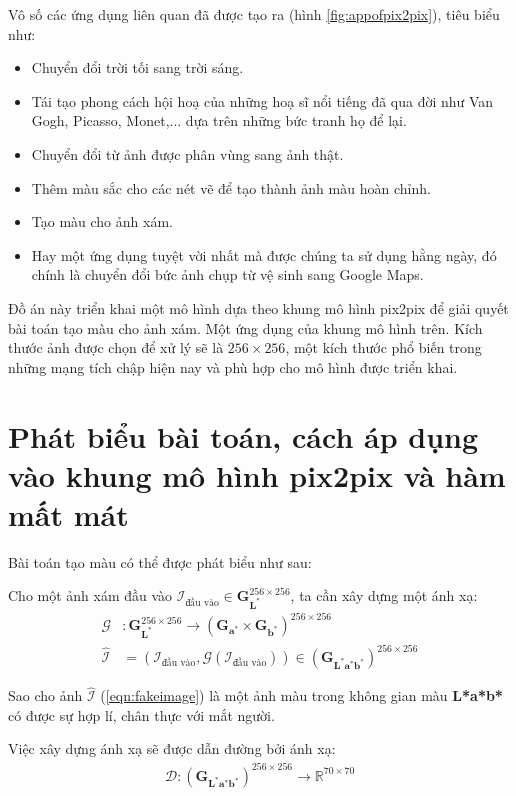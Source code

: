 \documentclass[a4paper, 12pt]{report}
\begin{document}
Vô số các ứng dụng liên quan đã được tạo ra (hình \ref{fig:appofpix2pix}), tiêu biểu như:

\begin{itemize}
    \item Chuyển đổi trời tối sang trời sáng.
    \item Tái tạo phong cách hội hoạ của những hoạ sĩ nổi tiếng đã qua đời như Van Gogh, Picasso, Monet,... dựa trên những bức tranh họ để lại.
    \item Chuyển đổi từ ảnh được phân vùng sang ảnh thật.
    \item Thêm màu sắc cho các nét vẽ để tạo thành ảnh màu hoàn chỉnh.
    \item Tạo màu cho ảnh xám.
    \item Hay một ứng dụng tuyệt vời nhất mà được chúng ta sử dụng hằng ngày, đó chính là chuyển đổi bức ảnh chụp từ vệ sinh sang Google Maps.
\end{itemize}

Đồ án này triển khai một mô hình dựa theo khung mô hình pix2pix để giải quyết bài toán tạo màu cho ảnh xám.
Một ứng dụng của khung mô hình trên.
Kích thước ảnh được chọn để xử lý sẽ là $256 \times 256$, một kích thước phổ biến trong những mạng tích chập hiện nay và phù hợp cho mô hình được triển khai.

\section{Phát biểu bài toán, cách áp dụng vào khung mô hình pix2pix và hàm mất mát}

Bài toán tạo màu có thể được phát biểu như sau:

\begin{tcolorbox}
Cho một ảnh xám đầu vào $\mathcal{I}_{\text{đầu vào}} \in \bm{G}_{\mathbf{L}^*}^{256 \times 256}$, ta cần xây dựng một ánh xạ:
\begin{align}
    \mathcal{G}&: \bm{G}_{\mathbf{L}^*}^{256 \times 256} \rightarrow \left(\bm{G}_{\mathbf{a}^*} \times \bm{G}_{\mathbf{b}^*}\right)^{256 \times 256}\\
    \widehat{\mathcal{I}} &= \left(\mathcal{I}_{\text{đầu vào}}, \mathcal{G}\left(\mathcal{I}_{\text{đầu vào}}\right)\right) \in \left(\bm{G}_{\mathbf{L^*}\mathbf{a^*}\mathbf{b^*}}\right)^{256 \times 256}\label{eqn:fakeimage}
\end{align}

Sao cho ảnh $\widehat{\mathcal{I}}$ (\ref{eqn:fakeimage}) là một ảnh màu trong không gian màu \textbf{L*a*b*} có được sự hợp lí, chân thực với mắt người.\vspace{5pt}

Việc xây dựng ánh xạ sẽ được dẫn đường bởi ánh xạ:
\begin{align}
    \mathcal{D}:\left(\bm{G}_{\mathbf{L^*}\mathbf{a^*}\mathbf{b^*}}\right)^{256 \times 256} \rightarrow \mathbb{R}^{70 \times 70}
\end{align}

\end{tcolorbox}
\end{document}
